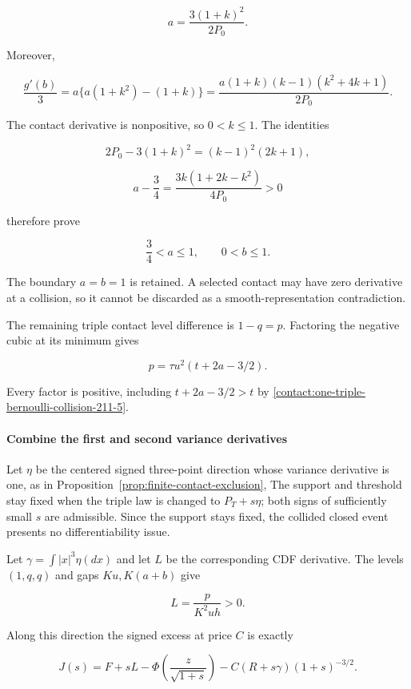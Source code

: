 \[
 a=\frac{3(1+k)^2}{2P_0}.
\tag{B.14.4}\label{contact:one-triple-bernoulli-collision-211-4}
\]

Moreover,

\[
 \frac{g'(b)}3
 =a\{a(1+k^2)-(1+k)\}
 =\frac{a(1+k)(k-1)(k^2+4k+1)}{2P_0}.
\]

The contact derivative is nonpositive, so $0<k\le 1$. The identities

\[
 2P_0-3(1+k)^2=(k-1)^2(2k+1),
\]

\[
 a-\frac34=\frac{3k(1+2k-k^2)}{4P_0}>0
\]

therefore prove

\[
 \boxed{\qquad \frac34<a\leq1,\qquad 0<b\leq1.\qquad}
\tag{B.14.5}\label{contact:one-triple-bernoulli-collision-211-5}
\]

The boundary $a=b=1$ is retained. A selected contact may have zero
derivative at a collision, so it cannot be discarded as a smooth-representation
contradiction.

The remaining triple contact level difference is $1-q=p$. Factoring the
negative cubic at its minimum gives

\[
 \boxed{\quad p=\tau u^2(t+2a-3/2).\quad}
\tag{B.14.6}\label{contact:one-triple-bernoulli-collision-211-6}
\]

Every factor is positive, including $t+2a-3/2>t$ by \eqref{contact:one-triple-bernoulli-collision-211-5}.

\paragraph{Combine the first and second variance derivatives}

Let $\eta$ be the centered signed three-point direction whose variance
derivative is one, as in
Proposition~\ref{prop:finite-contact-exclusion},
The support and threshold stay fixed when the triple law is
changed to $P_T+s \eta$; both signs of sufficiently small $s$ are admissible.
Since the support stays fixed, the collided closed event presents no
differentiability issue.

Let $\gamma=\int |x|^3 \eta(dx)$ and let $L$ be the corresponding CDF
derivative. The levels $(1,q,q)$ and gaps $Ku,K(a+b)$ give

\[
 \boxed{\quad L=\frac{p}{K^2u h}>0.\quad}
\tag{B.14.7}\label{contact:one-triple-bernoulli-collision-211-7}
\]

Along this direction the signed excess at price $C$ is exactly

\[
 J(s)=F+sL-\Phi\!\left(\frac z{\sqrt{1+s}}\right)
       -C(R+s\gamma)(1+s)^{-3/2}.
\]

